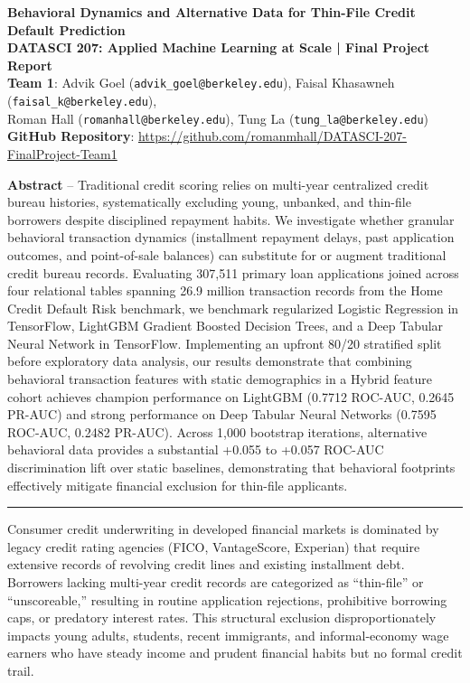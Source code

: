 \documentclass[10pt,letterpaper]{article}
\newcommand{\mysection}[1]{\vspace{4pt}\noindent{\large\bfseries #1}\vspace{1pt}\hrule\vspace{3pt}}
\begin{document}
\begin{center}
{\Large\bfseries Behavioral Dynamics and Alternative Data for Thin-File Credit Default Prediction}\\[2pt]
{\normalsize\textbf{DATASCI 207: Applied Machine Learning at Scale | Final Project Report}}\\[2pt]
{\small \textbf{Team 1}: Advik Goel (\texttt{advik\_goel@berkeley.edu}), Faisal Khasawneh (\texttt{faisal\_k@berkeley.edu}),\\
Roman Hall (\texttt{romanhall@berkeley.edu}), Tung La (\texttt{tung\_la@berkeley.edu})}\\
{\small \textbf{GitHub Repository}: \url{https://github.com/romanmhall/DATASCI-207-FinalProject-Team1}}
\end{center}
\vspace{-0.3em}

\noindent\textbf{Abstract} -- Traditional credit scoring relies on multi-year centralized credit bureau histories, systematically excluding young, unbanked, and thin-file borrowers despite disciplined repayment habits. We investigate whether granular behavioral transaction dynamics (installment repayment delays, past application outcomes, and point-of-sale balances) can substitute for or augment traditional credit bureau records. Evaluating 307,511 primary loan applications joined across four relational tables spanning 26.9 million transaction records from the Home Credit Default Risk benchmark, we benchmark regularized Logistic Regression in TensorFlow, LightGBM Gradient Boosted Decision Trees, and a Deep Tabular Neural Network in TensorFlow. Implementing an upfront 80/20 stratified split before exploratory data analysis, our results demonstrate that combining behavioral transaction features with static demographics in a Hybrid feature cohort achieves champion performance on LightGBM (0.7712 ROC-AUC, 0.2645 PR-AUC) and strong performance on Deep Tabular Neural Networks (0.7595 ROC-AUC, 0.2482 PR-AUC). Across 1,000 bootstrap iterations, alternative behavioral data provides a substantial +0.055 to +0.057 ROC-AUC discrimination lift over static baselines, demonstrating that behavioral footprints effectively mitigate financial exclusion for thin-file applicants.

\mysection{1. Introduction}
Consumer credit underwriting in developed financial markets is dominated by legacy credit rating agencies (FICO, VantageScore, Experian) that require extensive records of revolving credit lines and existing installment debt. Borrowers lacking multi-year credit records are categorized as ``thin-file'' or ``unscoreable,'' resulting in routine application rejections, prohibitive borrowing caps, or predatory interest rates. This structural exclusion disproportionately impacts young adults, students, recent immigrants, and informal-economy wage earners who have steady income and prudent financial habits but no formal credit trail.
\end{document}
